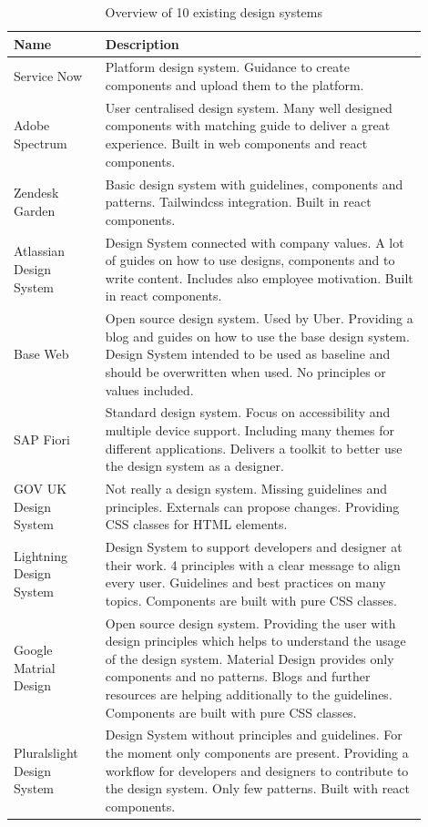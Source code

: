 \begin{table}[!ht]
\begin{tabular}{|p{0.2\linewidth} | p{0.7\linewidth}|}
\hline
 \textbf{Name} & \textbf{Description} \\ \hline
Service Now  & Platform design system.  Guidance to create components and upload them to the platform. \\ \hline
Adobe Spectrum  & User centralised design system. Many well designed components with matching guide to deliver a great experience. Built in web components and react components. \\ \hline
Zendesk Garden & Basic design system with guidelines, components and patterns. Tailwindcss integration. Built in react components. \\ \hline
Atlassian Design System & Design System connected with company values. A lot of guides on how to use designs, components and to write content. Includes also employee motivation. Built in react components. \\ \hline
Base Web  & Open source design system. Used by Uber. Providing a blog and guides on how to use the base design system. Design System intended to be used as baseline and should be overwritten when used. No principles or values included. \\ \hline
SAP Fiori  & Standard design system. Focus on accessibility and multiple device support. Including many themes for different applications. Delivers a toolkit to better use the design system as a designer.  \\ \hline
GOV UK Design System  & Not really a design system. Missing guidelines and principles. Externals can propose changes. Providing CSS classes for HTML elements.  \\ \hline
Lightning Design System & Design System to support developers and designer at their work. 4 principles with a clear message to align every user. Guidelines and best practices on many topics.  Components are built with pure CSS classes. \\ \hline
Google Matrial Design & Open source design system. Providing the user with design principles which helps to understand the usage of the design system. Material Design provides only components and no patterns. Blogs and further resources are helping additionally to the guidelines. Components are built with pure CSS classes. \\ \hline
Pluralslight Design System & Design System without principles and guidelines. For the moment only components are present. Providing a workflow for developers and designers to contribute to the design system.  Only few patterns. Built with react components.  \\ \hline
\end{tabular}
\caption{\label{tab:design_systems_in_the_wild} Overview of 10 existing design systems}
\end{table}
